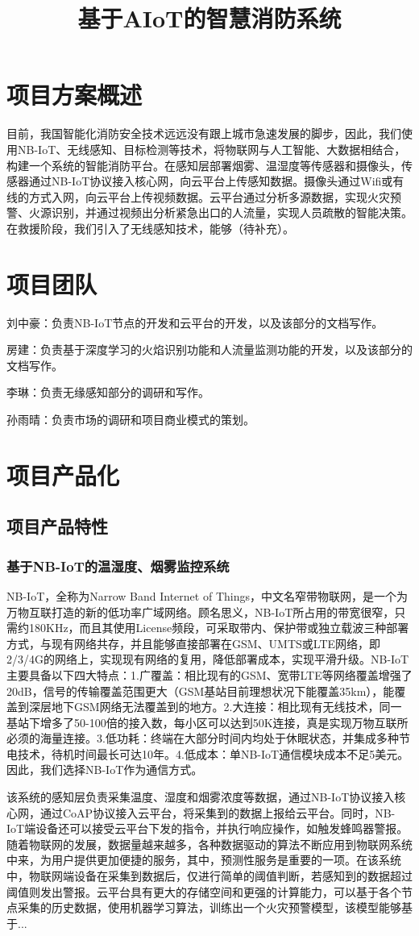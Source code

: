 \documentclass{ctexart}
\begin{document}
	\title{基于AIoT的智慧消防系统}
	\section{项目方案概述}
	目前，我国智能化消防安全技术远远没有跟上城市急速发展的脚步，因此，我们使用NB-IoT、无线感知、目标检测等技术，将物联网与人工智能、大数据相结合，构建一个系统的智能消防平台。在感知层部署烟雾、温湿度等传感器和摄像头，传感器通过NB-IoT协议接入核心网，向云平台上传感知数据。摄像头通过Wifi或有线的方式入网，向云平台上传视频数据。云平台通过分析多源数据，实现火灾预警、火源识别，并通过视频出分析紧急出口的人流量，实现人员疏散的智能决策。在救援阶段，我们引入了无线感知技术，能够（待补充）。
	\section{项目团队}
	刘中豪：负责NB-IoT节点的开发和云平台的开发，以及该部分的文档写作。\par
	房建：负责基于深度学习的火焰识别功能和人流量监测功能的开发，以及该部分的文档写作。\par
	李琳：负责无缘感知部分的调研和写作。\par
	孙雨晴：负责市场的调研和项目商业模式的策划。\par
	\section{项目产品化}
	\subsection{项目产品特性}
	\subsubsection{基于NB-IoT的温湿度、烟雾监控系统}
	NB-IoT，全称为Narrow Band Internet of Things，中文名窄带物联网，是一个为万物互联打造的新的低功率广域网络。顾名思义，NB-IoT所占用的带宽很窄，只需约180KHz，而且其使用License频段，可采取带内、保护带或独立载波三种部署方式，与现有网络共存，并且能够直接部署在GSM、UMTS或LTE网络，即2/3/4G的网络上，实现现有网络的复用，降低部署成本，实现平滑升级。NB-IoT主要具备以下四大特点：1.广覆盖：相比现有的GSM、宽带LTE等网络覆盖增强了20dB，信号的传输覆盖范围更大（GSM基站目前理想状况下能覆盖35km），能覆盖到深层地下GSM网络无法覆盖到的地方。2.大连接：相比现有无线技术，同一基站下增多了50-100倍的接入数，每小区可以达到50K连接，真是实现万物互联所必须的海量连接。3.低功耗：终端在大部分时间内均处于休眠状态，并集成多种节电技术，待机时间最长可达10年。4.低成本：单NB-IoT通信模块成本不足5美元。因此，我们选择NB-IoT作为通信方式。\par
	该系统的感知层负责采集温度、湿度和烟雾浓度等数据，通过NB-IoT协议接入核心网，通过CoAP协议接入云平台，将采集到的数据上报给云平台。同时，NB-IoT端设备还可以接受云平台下发的指令，并执行响应操作，如触发蜂鸣器警报。
	随着物联网的发展，数据量越来越多，各种数据驱动的算法不断应用到物联网系统中来，为用户提供更加便捷的服务，其中，预测性服务是重要的一项。在该系统中，物联网端设备在采集到数据后，仅进行简单的阈值判断，若感知到的数据超过阈值则发出警报。云平台具有更大的存储空间和更强的计算能力，可以基于各个节点采集的历史数据，使用机器学习算法，训练出一个火灾预警模型，该模型能够基于... \par
\end{document}
